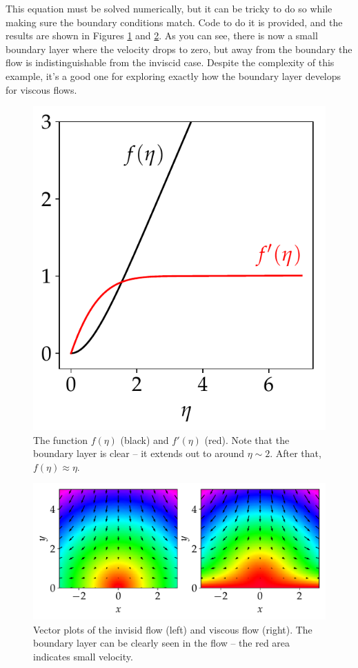 This equation must be solved numerically, but it can be tricky to do so while making sure the boundary conditions match.  Code to do it is provided, and the results are shown in Figures \ref{fig_boundary_result1} and \ref{fig_boundary_result2}.  As you can see, there is now a small boundary layer where the velocity drops to zero, but away from the boundary the flow is indistinguishable from the inviscid case.  Despite the complexity of this example, it's a good one for exploring exactly how the boundary layer develops for viscous flows.

\begin{figure}
\centering
\includegraphics[width=0.4\linewidth]{Figures/Chapter2/fig_boundary_result1}
\caption{The function $f(\eta)$ (black) and $f'(\eta)$ (red).  Note that the boundary layer is clear -- it extends out to around $\eta \sim 2$.  After that, $f(\eta) \approx \eta$.}
\label{fig_boundary_result1}
\end{figure}

\begin{figure}
\centering
\includegraphics[width=0.9\linewidth]{Figures/Chapter2/fig_boundary_result2}
\caption{Vector plots of the invisid flow (left) and viscous flow (right).  The boundary layer can be clearly seen in the flow -- the red area indicates small velocity.}
\label{fig_boundary_result2}
\end{figure}


